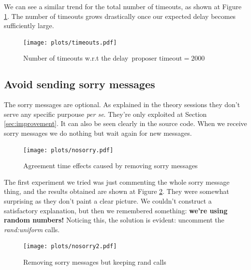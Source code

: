 \documentclass[a4paper, 10pt]{article}
\begin{document}
We can see a similar trend for the total number of timeouts, as shown at Figure \ref{timeouts}. The number of timeouts grows drastically once our expected delay becomes sufficiently large.

\begin{figure}[H]
  \centering
  \texttt{[image: plots/timeouts.pdf]}
    \caption{Number of timeouts w.r.t the delay\   $\text{proposer timeout}=2000$}
    \label{timeouts}
\end{figure} 

\clearpage






\subsection{Avoid sending sorry messages}
\label{sec:avoidsorry}

The sorry messages are optional. As explained in the theory sessions they don't serve any specific purpouse \textit{per se}. They're only exploited at Section \ref{sec:improvement}. It can also be seen clearly in the source code. When we receive sorry messages we do nothing but wait again for new messages.

\begin{figure}[H]
  \centering
  \texttt{[image: plots/nosorry.pdf]}
    \caption{Agreement time effects caused by removing sorry messages}
    \label{nosorry1}
\end{figure} 
The first experiment we tried was just commenting the whole sorry message thing, and the results obtained are shown at Figure \ref{nosorry1}. They were somewhat surprising as they don't paint a clear picture. We couldn't construct a satisfactory explanation, but then we remembered something: \textbf{we're using random numbers!} Noticing this, the solution is evident: uncomment the \textit{rand:uniform} calls.

\begin{figure}[H]
  \centering
  \texttt{[image: plots/nosorry2.pdf]}
    \caption{Removing sorry messages but keeping rand calls}
\end{figure} 
\end{document}
